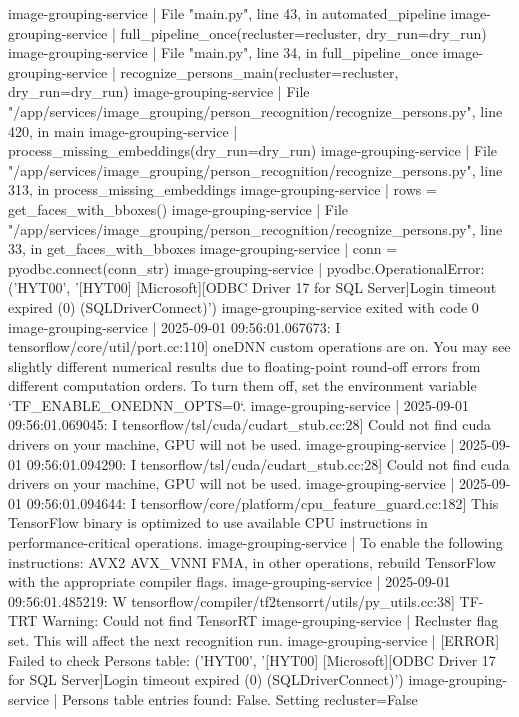 image-grouping-service  |   File "main.py", line 43, in automated_pipeline
image-grouping-service  |     full_pipeline_once(recluster=recluster, dry_run=dry_run)
image-grouping-service  |   File "main.py", line 34, in full_pipeline_once
image-grouping-service  |     recognize_persons_main(recluster=recluster, dry_run=dry_run)
image-grouping-service  |   File "/app/services/image_grouping/person_recognition/recognize_persons.py", line 420, in main
image-grouping-service  |     process_missing_embeddings(dry_run=dry_run)
image-grouping-service  |   File "/app/services/image_grouping/person_recognition/recognize_persons.py", line 313, in process_missing_embeddings
image-grouping-service  |     rows = get_faces_with_bboxes()
image-grouping-service  |   File "/app/services/image_grouping/person_recognition/recognize_persons.py", line 33, in get_faces_with_bboxes
image-grouping-service  |     conn = pyodbc.connect(conn_str)
image-grouping-service  | pyodbc.OperationalError: ('HYT00', '[HYT00] [Microsoft][ODBC Driver 17 for SQL Server]Login timeout expired (0) (SQLDriverConnect)')
image-grouping-service exited with code 0
image-grouping-service  | 2025-09-01 09:56:01.067673: I tensorflow/core/util/port.cc:110] oneDNN custom operations are on. You may see slightly different numerical results due to floating-point round-off errors from different computation orders. To turn them off, set the environment variable `TF_ENABLE_ONEDNN_OPTS=0`.
image-grouping-service  | 2025-09-01 09:56:01.069045: I tensorflow/tsl/cuda/cudart_stub.cc:28] Could not find cuda drivers on your machine, GPU will not be used.
image-grouping-service  | 2025-09-01 09:56:01.094290: I tensorflow/tsl/cuda/cudart_stub.cc:28] Could not find cuda drivers on your machine, GPU will not be used.
image-grouping-service  | 2025-09-01 09:56:01.094644: I tensorflow/core/platform/cpu_feature_guard.cc:182] This TensorFlow binary is optimized to use available CPU instructions in performance-critical operations.
image-grouping-service  | To enable the following instructions: AVX2 AVX_VNNI FMA, in other operations, rebuild TensorFlow with the appropriate compiler flags.
image-grouping-service  | 2025-09-01 09:56:01.485219: W tensorflow/compiler/tf2tensorrt/utils/py_utils.cc:38] TF-TRT Warning: Could not find TensorRT
image-grouping-service  | Recluster flag set. This will affect the next recognition run.
image-grouping-service  | [ERROR] Failed to check Persons table: ('HYT00', '[HYT00] [Microsoft][ODBC Driver 17 for SQL Server]Login timeout expired (0) (SQLDriverConnect)')
image-grouping-service  | Persons table entries found: False. Setting recluster=False
